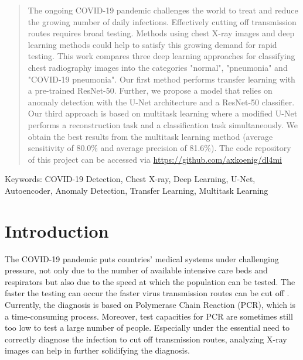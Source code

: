 \documentclass[conference]{IEEEtran}
\begin{document}




\maketitle

\begin{abstract}
The ongoing COVID-19 pandemic challenges the world to treat and reduce the growing number of daily infections. Effectively cutting off transmission routes requires broad testing. Methods using chest X-ray images and deep learning methods could help to satisfy this growing demand for rapid testing. This work compares three deep learning approaches for classifying chest radiography images into the categories "normal", "pneumonia" and "COVID-19 pneumonia". Our first method performs transfer learning with a pre-trained ResNet-50. Further, we propose a model that relies on anomaly detection with the U-Net architecture and a ResNet-50 classifier. Our third approach is based on multitask learning where a modified U-Net performs a reconstruction task and a classification task simultaneously. We obtain the best results from the multitask learning method (average sensitivity of 80.0\% and average precision of 81.6\%). The code repository of this project can be accessed via \url{https://github.com/axkoenig/dl4mi}
\end{abstract}

Keywords: COVID-19 Detection, Chest X-ray, Deep Learning, U-Net, Autoencoder, Anomaly Detection, Transfer Learning, Multitask Learning

%
\IEEEpeerreviewmaketitle


\label{chap1_introduction}
\section{Introduction}

The COVID-19 pandemic puts countries' medical systems under challenging pressure, not only due to the number of available intensive care beds and respirators but also due to the speed at which the population can be tested. The faster the testing can occur the faster virus transmission routes can be cut off \cite{salathe2020covid}. Currently, the diagnosis is based on Polymerase Chain Reaction (PCR), which is a time-consuming process. Moreover, test capacities for PCR are sometimes still too low to test a large number of people. Especially under the essential need to correctly diagnose the infection to cut off transmission routes, analyzing X-ray images can help in further solidifying the diagnosis. 
\end{document}

